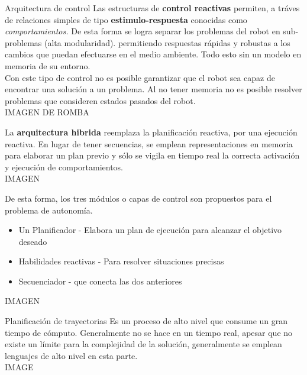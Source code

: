 \documentclass[
	11pt, %
]{beamer}
\begin{document}
\begin{frame}{Arquitectura de control}
  Las estructuras de \textbf{control reactivas} permiten, a tr\'{a}ves de relaciones simples de tipo \textbf{estimulo-respuesta} conocidas como \textit{comportamientos.} De esta forma se logra separar los problemas del robot en sub-problemas (alta modularidad). permitiendo respuestas r\'{a}pidas y robustas a los cambios que puedan efectuarse en el medio ambiente. Todo esto sin un modelo en memoria de su entorno.\\
  Con este tipo de control no es posible garantizar que el robot sea capaz de encontrar una soluci\'{o}n a un problema. Al no tener memoria no es posible resolver problemas que consideren estados pasados del robot.\\

  IMAGEN DE ROMBA
  
\end{frame}

\begin{frame}{}
  La \textbf{arquitectura hibrida} reemplaza la planificaci\'{o}n reactiva, por una ejecuci\'{o}n reactiva. En lugar de tener secuencias, se emplean representaciones en memoria para elaborar un plan previo y s\'{o}lo se vigila en tiempo real la correcta activaci\'{o}n y ejecuci\'{o}n de comportamientos.\\
  IMAGEN
\end{frame}

\begin{frame}{}
  De esta forma, los tres m\'{o}dulos o capas de control son propuestos para el problema de autonom\'{i}a.
  \begin{itemize}
  \item Un Planificador - Elabora un plan de ejecuci\'{o}n para alcanzar el objetivo deseado
  \item Habilidades reactivas - Para resolver situaciones precisas
  \item Secuenciador - que conecta las dos anteriores
  \end{itemize}
  IMAGEN  
\end{frame}

\begin{frame}{Planificaci\'{o}n de trayectorias}
  Es un proceso de alto nivel que consume un gran tiempo de c\'{o}mputo. Generalmente no se hace en un tiempo real, apesar que no existe un l\'{i}mite para la complejidad de la soluci\'{o}n, generalmente se emplean lenguajes de alto nivel en esta parte.\\
  IMAGE
\end{frame}
\end{document}
